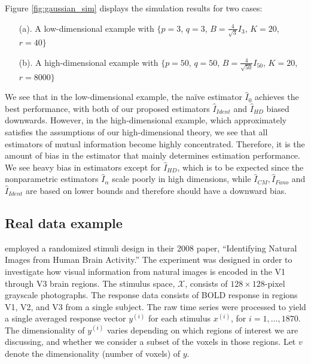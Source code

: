 Figure \ref{fig:gaussian_sim} displays the simulation results for two
cases: 
\begin{itemize}
\item[(a).] A low-dimensional example with $\{p = 3$, $q = 3$, $B = \frac{4}{\sqrt{3}} I_3$, $K = 20$, $r = 40\}$
\item[(b).] A high-dimensional example with $\{p = 50$, $q = 50$, $B = \frac{4}{\sqrt{50}} I_{50}$, $K = 20$, $r = 8000\}$
\end{itemize}
We see that in the low-dimensional example, the na\"{i}ve estimator
$\hat{I}_0$ achieves the best performance, with both of our proposed
estimators $\hat{I}_{Ident}$ and $\hat{I}_{HD}$ biased downwards.
However, in the high-dimensional example, which approximately
satisfies the assumptions of our high-dimensional theory, we see that
all estimators of mutual information become highly concentrated.
Therefore, it is the amount of bias in the estimator that mainly
determines estimation performance.  We see heavy bias in estimators
except for $\hat{I}_{HD}$, which is to be expected since the
nonparametric estimators $\hat{I}_\alpha$ scale poorly in high
dimensions, while $\hat{I}_{CM}, \hat{I}_{Fano}$ and $\hat{I}_{Ident}$
are based on lower bounds and therefore should have a downward bias.

\subsection{Real data example}\label{sec:real_data}

\cite{Kay2008a} employed a randomized stimuli design in their 2008 paper,
``Identifying Natural Images from Human Brain Activity.''  The
experiment was designed in order to investigate how visual information
from natural images is encoded in the V1 through V3 brain regions.
The stimulus space, $\mathcal{X}$, consists of $128 \times 128$-pixel
grayscale photographs.  The response data consists of BOLD response in
regions V1, V2, and V3 from a single subject.  The raw time series were
processed to yield a single averaged response vector $y^{(i)}$ for each
stimulus $x^{(i)}$, for $i = 1,\hdots, 1870$.
The dimensionality of $y^{(i)}$ varies depending on which regions of interest
we are discussing, and whether we consider a subset of the voxels in those regions.
Let $v$ denote the dimensionality (number of voxels) of $y$.


